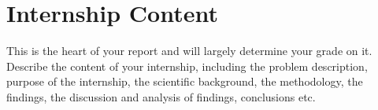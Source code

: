 \chapter{Internship Content}
This is the heart of your report and will largely determine your grade on it. Describe the content of your internship, including the problem description, purpose of the internship, the scientific background, the methodology, the findings, the discussion and analysis of findings, conclusions etc. 